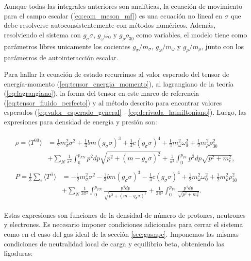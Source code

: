 Aunque todas las integrales anteriores son analíticas, la ecuación de movimiento para el campo escalar (\ref{eq:eom_meson_mf}) es una ecuación no lineal en $\sigma$ que debe resolverse autoconsistentemente con métodos numéricos. Además, resolviendo el sistema con $g_\sigma \sigma$, $g_\omega \omega_0$ y $g_\rho \rho_{30}$ como variables, el modelo tiene como parámetros libres unicamente los cocientes $g_\sigma/m_\sigma$, $g_\omega/m_\omega$ y $g_\rho/m_\rho$, junto con los parámetros de autointeracción escalar.

Para hallar la ecuación de estado recurrimos al valor esperado del tensor de energía-momento (\ref{eq:tensor_energia_momento}), al lagrangiano de la teoría (\ref{eq:lagrangiano}), la forma del tensor en este marco de referencia (\ref{eq:tensor_fluido_perfecto}) y al método descrito para encontrar valores esperados (\ref{eq:valor_esperado_general} - \ref{eq:derivada_hamiltoniano}). Luego, las expresiones para densidad de energía y presión son:

\begin{gather}
	\begin{aligned}
		\rho = \langle T^{00} \rangle &= \frac{1}{2}m_\sigma^2\sigma^2 + \frac{1}{3}bm(g_\sigma\sigma)^3 + \frac{1}{4}c(g_\sigma\sigma)^4 + \frac{1}{2}m_\omega^2\omega_0^2 + \frac{1}{2}m_\rho^2\rho_{30}^2 \\
		&+ \sum_N \frac{1}{\pi^2}\int_0^{p_{FN}} p^2 dp \sqrt{p^2 + (m-g_\sigma\sigma)^2} + \frac{1}{\pi^2}\int_0^{p_{Fe}} p^2 dp \sqrt{p^2 + m_e^2},
		\label{eq:densidad_energia}
	\end{aligned} \\
	\begin{aligned}
		P = \frac{1}{3}\sum_i \langle T^{ii} \rangle &= - \frac{1}{2}m_\sigma^2\sigma^2 - \frac{1}{3}bm(g_\sigma\sigma)^3 - \frac{1}{4}c(g_\sigma\sigma)^4 + \frac{1}{2}m_\omega^2\omega_0^2 + \frac{1}{2}m_\rho^2\rho_{30}^2 \\
		&+ \sum_N \frac{1}{3\pi^2}\int_0^{p_{FN}} \frac{p^4 dp}{\sqrt{p^2 + (m-g_\sigma\sigma)^2}} + \frac{1}{3\pi^2}\int_0^{p_{Fe}} \frac{p^4 dp}{\sqrt{p^2 + m_e^2}}.
		\label{eq:presion}
	\end{aligned}
\end{gather}

Estas expresiones son funciones de la densidad de número de protones, neutrones y electrones. Es necesario imponer condiciones adicionales para cerrar el sistema como en el caso del gas ideal de la sección \ref{sec:gasnpe}. Imponemos las mismas condiciones de neutralidad local de carga y equilibrio beta, obteniendo las ligaduras: 

